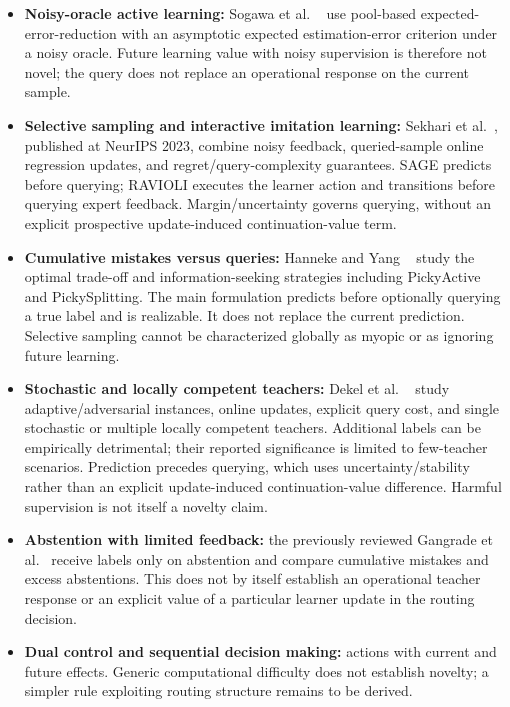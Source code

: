 \begin{itemize}
    parity constraint, without explicitly valuing the expected future
    surrogate improvement from the particular call.
  \item \textbf{Noisy-oracle active learning:} Sogawa et al.
    ~\cite{sogawa2013active} use pool-based expected-error-reduction with an
    asymptotic expected estimation-error criterion under a noisy oracle.
    Future learning value with noisy supervision is therefore not novel;
    the query does not replace an operational response on the current sample.
  \item \textbf{Selective sampling and interactive imitation learning:}
    Sekhari et al.\ \cite{sekhari2023selective}, published at NeurIPS 2023,
    combine noisy feedback, queried-sample online regression updates, and
    regret/query-complexity guarantees. SAGE predicts before querying;
    RAVIOLI executes the learner action and transitions before querying
    expert feedback. Margin/uncertainty governs querying, without an explicit
    prospective update-induced continuation-value term.
  \item \textbf{Cumulative mistakes versus queries:} Hanneke and Yang
    ~\cite{hanneke2021toward} study the optimal trade-off and information-seeking
    strategies including PickyActive and PickySplitting. The main formulation
    predicts before optionally querying a true label and is realizable.
    It does not replace the current prediction. Selective sampling cannot
    be characterized globally as myopic or as ignoring future learning.
  \item \textbf{Stochastic and locally competent teachers:} Dekel et al.
    ~\cite{dekel2012selective} study adaptive/adversarial instances, online
    updates, explicit query cost, and single stochastic or multiple locally
    competent teachers. Additional labels can be empirically detrimental;
    their reported significance is limited to few-teacher scenarios.
    Prediction precedes querying, which uses uncertainty/stability rather
    than an explicit update-induced continuation-value difference.
    Harmful supervision is not itself a novelty claim.
  \item \textbf{Abstention with limited feedback:} the previously reviewed
    Gangrade et al.\ \cite{gangrade2021online} receive labels only on
    abstention and compare cumulative mistakes and excess abstentions.
    This does not by itself establish an operational teacher response or an
    explicit value of a particular learner update in the routing decision.
  \item \textbf{Dual control and sequential decision making:} actions
    with current and future effects. Generic computational difficulty
    does not establish novelty; a simpler rule exploiting routing structure
    remains to be derived.
\end{itemize}

